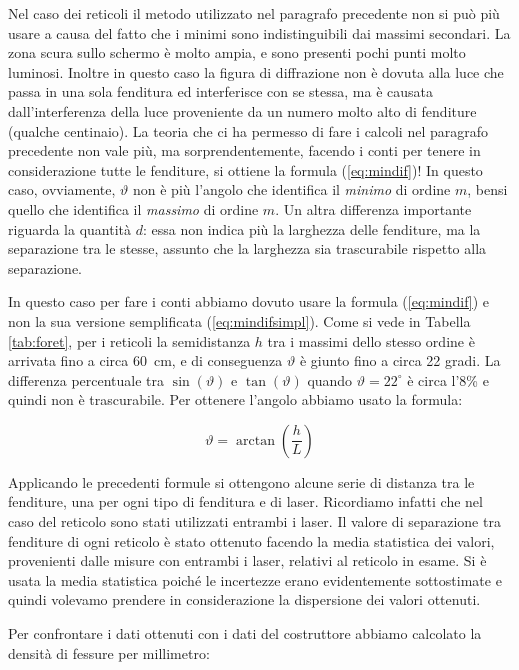 Nel caso dei reticoli il metodo utilizzato nel paragrafo precedente non si può più usare a causa del fatto che i minimi sono
indistinguibili dai massimi secondari. La zona scura sullo schermo è molto ampia, e sono presenti pochi punti molto luminosi.
Inoltre in questo caso la figura di diffrazione non è dovuta alla luce che passa in una sola fenditura ed interferisce con se stessa,
ma è causata dall'interferenza della luce proveniente da un numero molto alto di fenditure (qualche centinaio).
La teoria che ci ha permesso di fare i calcoli nel paragrafo precedente non vale più, ma sorprendentemente, facendo i conti per
tenere in considerazione tutte le fenditure, si ottiene la formula (\ref{eq:mindif})! In questo caso, ovviamente, $\vartheta$
non è più l'angolo che identifica il \emph{minimo} di ordine $m$, bensi quello che identifica il \emph{massimo} di ordine $m$.
Un altra differenza importante riguarda la quantità $d$: essa non indica più la larghezza delle fenditure, ma la separazione tra
le stesse, assunto che la larghezza sia trascurabile rispetto alla separazione.

In questo caso per fare i conti abbiamo dovuto usare la formula (\ref{eq:mindif}) e non la sua versione semplificata (\ref{eq:mindifsimpl}).
Come si vede in Tabella \ref{tab:foret}, per i reticoli la semidistanza $h$ tra i massimi dello stesso ordine è arrivata fino a circa
\SI{60}{\centi\metre}, e di conseguenza $\vartheta$ è giunto fino a circa 22 gradi. La differenza percentuale tra $\sin(\vartheta)$ e
$\tan(\vartheta)$ quando $\vartheta = 22^\circ$ è circa l'8\% e quindi non è trascurabile. Per ottenere l'angolo abbiamo usato la formula:

\begin{equation}
    \vartheta = \arctan\left(\frac{h}{L}\right)
\end{equation}

Applicando le precedenti formule si ottengono alcune serie di distanza tra le fenditure, una per ogni tipo di fenditura e di laser.
Ricordiamo infatti che nel caso del reticolo sono stati utilizzati entrambi i laser. Il valore di separazione tra
fenditure di ogni reticolo è stato ottenuto facendo la media statistica dei valori, provenienti dalle misure con
entrambi i laser, relativi al reticolo in esame. Si è usata la media statistica poiché le incertezze erano
evidentemente sottostimate e quindi volevamo prendere in considerazione la dispersione dei valori ottenuti.

Per confrontare i dati ottenuti con i dati del costruttore abbiamo calcolato la densità di fessure per millimetro:

